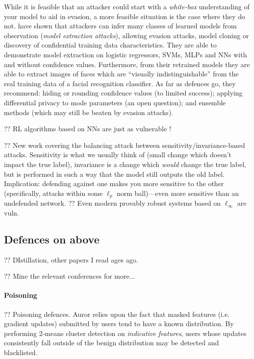 While it is feasible that an attacker could start with a \emph{white-box} understanding of your model to aid in evasion, a more feasible situation is the case where they do not.
\textcite{DBLP:conf/uss/TramerZJRR16} have shown that attackers can infer many classes of learned models from observation (\emph{model extraction attacks}), allowing evasion attacks, model cloning or discovery of confidential training data characteristics.
They are able to demonstrate model extraction on logistic regressors, SVMs, MLPs and NNs with and without confidence values.
Furthermore, from their retrained models they are able to extract images of faces which are ``visually indistinguishable'' from the real training data of a facial recognition classifier.
As far as defences go, they recommend: hiding or rounding confidence values (to limited success); applying differential privacy to mode parameters (an open question); and ensemble methods (which may still be beaten by evasion attacks).

?? RL algorithms based on NNs are just as vulnerable \cite{DBLP:journals/corr/HuangPGDA17}!

?? New work \parencite{DBLP:journals/corr/abs-2002-04599} covering the balancing attack between sensitivity/invariance-based attacks. Sensitivity is what we usually think of (small change which doesn't impact the true label), invariance is a change which \emph{would} change the true label, but is performed in such a way that the model still outputs the old label. Implication: defending against one makes you more sensitive to the other (specifically, attacks within some $\ell_p$ norm ball)---even more sensitive than an undefended network.
?? Even modern provably robust systems based on $\ell_\infty$ \parencite{DBLP:conf/iclr/ZhangCXGSLBH20} are vuln.

\subsection{Defences on above}

?? DIstillation, other papers I read ages ago.

?? Mine the relevant conferences for more...

\paragraph{Poisoning}
?? Poisoning defences. Auror \cite{DBLP:conf/acsac/ShenTS16} relies upon the fact that masked features (i.e. gradient updates) submitted by users tend to have a known distribution.
By performing 2-means cluster detection on \emph{indicative features}, users whose updates consistently fall outside of the benign distribution may be detected and blacklisted.

